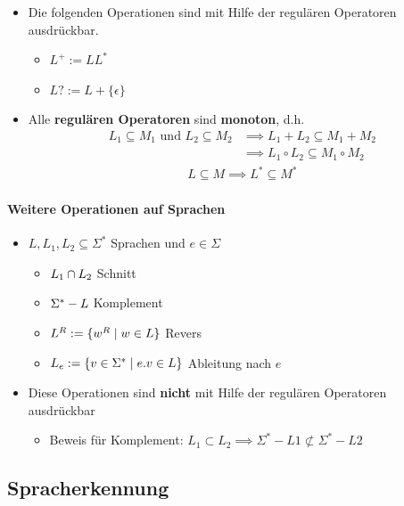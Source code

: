 \documentclass{scrartcl}
\begin{document}
\begin{itemize}
	\item Die folgenden Operationen sind mit Hilfe der regulären Operatoren ausdrückbar.
	\begin{itemize}
		\item $L^+ := LL^*$
		\item $L? := L + \{ \epsilon \}$
	\end{itemize}
	\item Alle \textbf{regulären Operatoren} sind \textbf{monoton}, d.h.
	\begin{align*}
		L_1 \subseteq M_1 \text{ und } L_2 \subseteq M_2 &\implies L_1 + L_2 \subseteq M_1 + M_2 \\
		&\implies L_1 \circ L_2 \subseteq M_1 \circ M_2
	\end{align*}
	\begin{align*}
		L \subseteq M \implies L^* \subseteq M^*
	\end{align*}
\end{itemize}

\paragraph{Weitere Operationen auf Sprachen}

\begin{itemize}
	\item $L, L_1, L_2 \subseteq \Sigma^*$ Sprachen und $e \in \Sigma$
	\begin{itemize}
		\item $L_1 \cap L_2 \hfill$ Schnitt
		\item $\Sigma^* - L \hfill$ Komplement
		\item $L^R := \{ w^R \mid w \in L \} \hfill$ Revers
		\item $L_e := \{ v \in \Sigma^* \mid e.v \in L \} \hfill$ Ableitung nach $e$
	\end{itemize}
	\item Diese Operationen sind \textbf{nicht} mit Hilfe der regulären Operatoren ausdrückbar
	\begin{itemize}
		\item Beweis für Komplement: $L_1 \subset L_2 \implies \Sigma^* - L1 \not \subset \Sigma^* - L2$
	\end{itemize}
\end{itemize}

\subsection{Spracherkennung}
\end{document}
